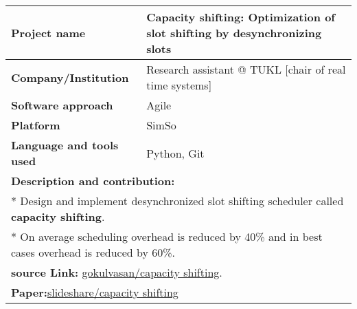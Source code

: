 \documentclass[letterpaper]{twentysecondcv} %
\begin{document}
  \begin{tabular}{ |p{7cm}|p{13cm}| }
 \hline
\rowcolor{sidecolor} 
\textbf{{\large Project name}} & \textbf{Capacity shifting: Optimization of slot shifting by desynchronizing slots}\\[2ex]
 \hline
\rowcolor{sidecolor}
\textbf{{\large Company/Institution}} & Research assistant @ TUKL [chair of real time systems]\\[2ex]
 \hline
 \textbf{{\large Software approach}} & Agile \\[2ex]
 \hline
 \textbf{{\large Platform}} & SimSo \\[2ex]
 \hline
  \textbf{{\large Language and tools used}} & Python, Git \\[2ex]
 \hline
 
 \multicolumn{2}{l}{
 \textbf{\large Description and contribution:}} \\[2ex]
 \multicolumn{2}{l}{
 	* Design and implement desynchronized slot shifting scheduler called \textbf{capacity shifting}.}\\
 \multicolumn{2}{l}{
 	* On average scheduling overhead is reduced by 40\% and in best cases overhead is reduced by 60\%.}\\
 \multicolumn{2}{l}{
 	{\textcolor{yt} \faGlobe} \textbf{source Link:} \href{https://github.com/gokulvasan/CapacityShifting}{gokulvasan/capacity shifting}.
 	}\\
 	 \multicolumn{2}{l}{
 	{\textcolor{yt} \faGlobe} \textbf{Paper:}\href{https://www.slideshare.net/slideshow/embed_code/key/rh0b15TjW1YumY}{slideshare/capacity shifting}
 }\\
 \hline
 \hline
 \end{tabular}
 
  
 \vspace{6mm}
 
\end{document}
